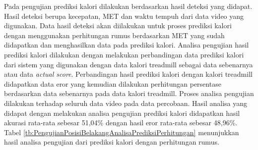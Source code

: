 Pada pengujian prediksi kalori dilakukan berdasarkan hasil deteksi yang didapat. Hasil deteksi berupa kecepatan, MET dan waktu tempuh dari data video yang digunakan. Data hasil deteksi akan diilakukan untuk proses prediksi kalori dengan menggunakan perhitungan rumus berdasarkan MET yang sudah didapatkan dan menghasilkan data pada prediksi kalori. Analisa pengujian hasil prediksi kalori dilakukan dengan melakukan perbandingan data prediksi kalori dari sistem yang digunakan dengan data kalori treadmill sebagai data sebenarnya atau data \emph{actual score}. Perbandingan hasil prediksi kalori dengan kalori treadmill didapatkan data eror yang kemudian dilakukan perhitungan persentase berdasarkan data sebenarnya pada data kalori treadmill. Proses analisa pengujian dilakukan terhadap seluruh data video pada data percobaan. Hasil analisa yang didapat dengan melakukan analisa pengujian prediksi kalori didapatkan hasil akurasi rata-rata sebesar 51,04\% dengan hasil eror rata-rata sebesar 48,96\%. Tabel \ref{tb:PengujianPosisiBelakangAnalisaPrediksiPerhitungan} menunjukkan hasil analisa pengujian dari prediksi kalori dengan perhitungan rumus.

